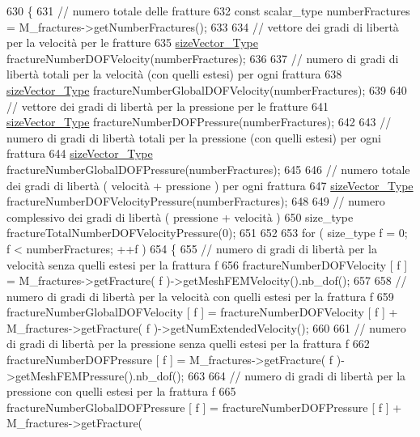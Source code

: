 \begin{DoxyCode}
630 \{  
631     \textcolor{comment}{// numero totale delle fratture}
632     \textcolor{keyword}{const} scalar\_type numberFractures = M\_fractures->getNumberFractures();
633    
634     \textcolor{comment}{// vettore dei gradi di libertà per la velocità per le fratture}
635     \hyperlink{Core_8h_a83c51913d041a5001e8683434c09857f}{sizeVector\_Type} fractureNumberDOFVelocity(numberFractures);
636     
637     \textcolor{comment}{// numero di gradi di libertà totali per la velocità (con quelli estesi) per ogni frattura }
638     \hyperlink{Core_8h_a83c51913d041a5001e8683434c09857f}{sizeVector\_Type} fractureNumberGlobalDOFVelocity(numberFractures);
639 
640     \textcolor{comment}{// vettore dei gradi di libertà per la pressione per le fratture}
641     \hyperlink{Core_8h_a83c51913d041a5001e8683434c09857f}{sizeVector\_Type} fractureNumberDOFPressure(numberFractures);
642     
643     \textcolor{comment}{// numero di gradi di libertà totali per la pressione (con quelli estesi) per ogni frattura }
644     \hyperlink{Core_8h_a83c51913d041a5001e8683434c09857f}{sizeVector\_Type} fractureNumberGlobalDOFPressure(numberFractures);
645 
646     \textcolor{comment}{// numero totale dei gradi di libertà ( velocità + pressione ) per ogni frattura}
647     \hyperlink{Core_8h_a83c51913d041a5001e8683434c09857f}{sizeVector\_Type} fractureNumberDOFVelocityPressure(numberFractures);
648 
649     \textcolor{comment}{// numero complessivo dei gradi di libertà ( pressione + velocità ) }
650     size\_type fractureTotalNumberDOFVelocityPressure(0);
651 
652     
653     \textcolor{keywordflow}{for} ( size\_type f = 0; f < numberFractures; ++f )
654     \{
655         \textcolor{comment}{// numero di gradi di libertà per la velocità senza quelli estesi per la frattura f}
656         fractureNumberDOFVelocity [ f ] = M\_fractures->getFracture( f )->getMeshFEMVelocity().nb\_dof();
657 
658         \textcolor{comment}{// numero di gradi di libertà per la velocità con quelli estesi per la frattura f}
659         fractureNumberGlobalDOFVelocity [ f ] = fractureNumberDOFVelocity [ f ] + M\_fractures->getFracture(
       f )->getNumExtendedVelocity();
660 
661         \textcolor{comment}{// numero di gradi di libertà per la pressione senza quelli estesi per la frattura f}
662         fractureNumberDOFPressure [ f ] = M\_fractures->getFracture( f )->getMeshFEMPressure().nb\_dof();
663 
664         \textcolor{comment}{// numero di gradi di libertà per la pressione con quelli estesi per la frattura f}
665         fractureNumberGlobalDOFPressure [ f ] = fractureNumberDOFPressure [ f ] + M\_fractures->getFracture(

\end{DoxyCode}
